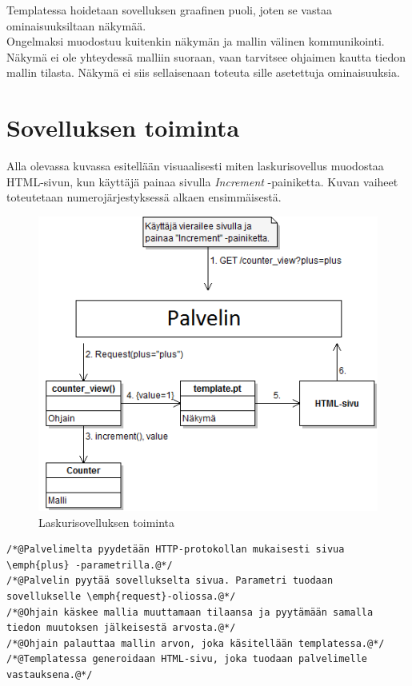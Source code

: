 \documentclass[utf8]{gradu3}
\begin{document}
Templatessa hoidetaan sovelluksen graafinen puoli, joten se vastaa ominaisuuksiltaan näkymää. \\ Ongelmaksi muodostuu kuitenkin näkymän ja mallin välinen kommunikointi. Näkymä ei ole yhteydessä malliin suoraan, vaan tarvitsee ohjaimen kautta tiedon mallin tilasta.  Näkymä ei siis sellaisenaan toteuta sille asetettuja ominaisuuksia. \\

\section{Sovelluksen toiminta}
Alla olevassa kuvassa esitellään visuaalisesti miten laskurisovellus muodostaa HTML-sivun, kun käyttäjä painaa sivulla \emph{Increment} -painiketta. Kuvan
vaiheet toteutetaan numerojärjestyksessä alkaen ensimmäisestä.
\begin{figure}[h]
\centering
\includegraphics[scale=0.87]{laskurisovellus.png}
\caption{Laskurisovelluksen toiminta}
\end{figure}

\begin{lstlisting}
/*@Palvelimelta pyydetään HTTP-protokollan mukaisesti sivua \emph{plus} -parametrilla.@*/
/*@Palvelin pyytää sovellukselta sivua. Parametri tuodaan sovellukselle \emph{request}-oliossa.@*/
/*@Ohjain käskee mallia muuttamaan tilaansa ja pyytämään samalla tiedon muutoksen jälkeisestä arvosta.@*/
/*@Ohjain palauttaa mallin arvon, joka käsitellään templatessa.@*/
/*@Templatessa generoidaan HTML-sivu, joka tuodaan palvelimelle vastauksena.@*/
\end{lstlisting}
\end{document}
